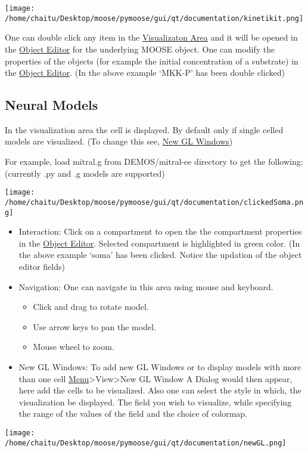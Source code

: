 \documentclass[11pt]{article}
\begin{document}
  \texttt{[image: /home/chaitu/Desktop/moose/pymoose/gui/qt/documentation/kinetikit.png]}

   One can double click any item in the \hyperref[sec-2]{Visualizaton Area} and it  will be opened in the \hyperref[sec-2]{Object Editor} for the underlying MOOSE object. One can modify the properties of the objects (for example the initial concentration of a substrate) in the \hyperref[sec-2]{Object Editor}. (In the above example `MKK-P' has been double clicked)

   
\subsection{Neural Models}
\label{sec-3.2}

    In the visualization area the cell is displayed. By default only if single celled models are visualized. (To change this see, \hyperref[sec-3.2]{New GL Windows})
    
    For example, load mitral.g from DEMOS/mitral-ee directory to get the following:  (currently .py and .g models are supported) 

  \texttt{[image: /home/chaitu/Desktop/moose/pymoose/gui/qt/documentation/clickedSoma.png]}
    
\begin{itemize}
\item Interaction: 
      Click on a compartment to open the the compartment properties in the \hyperref[sec-2]{Object Editor}. Selected compartment is highlighted in green color. (In the above example `soma' has been clicked. Notice the updation of the object editor fields)
\item Navigation:
      One can navigate in this area using mouse and keyboard.

\begin{itemize}
\item Click and drag to rotate model.
\item Use arrow keys to pan the model.
\item Mouse wheel to zoom.
\end{itemize}

\end{itemize}
    
\begin{itemize}
\item New GL Windows:
      To add new GL Windows or to display models with more than one cell \hyperref[sec-2]{Menu}>View>New GL Window  A Dialog would then appear, here add the cells to be visualized. Also one can select the style in which, the visualization be displayed. The field you wish to visualize, while specifying the range of the values of the field and the choice of colormap.
\end{itemize}
  \texttt{[image: /home/chaitu/Desktop/moose/pymoose/gui/qt/documentation/newGL.png]}
\end{document}
